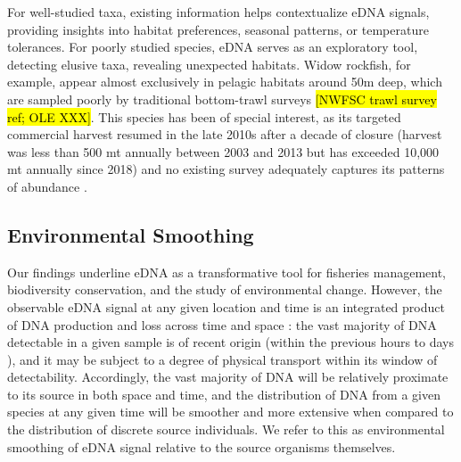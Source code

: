 \documentclass[9pt,twocolumn,twoside]{pnas-new}
\begin{document}
For well-studied taxa, existing information helps contextualize eDNA signals, providing insights into habitat preferences, seasonal patterns, or temperature tolerances. For poorly studied species, eDNA serves as an exploratory tool, detecting elusive taxa, revealing unexpected habitats. Widow rockfish, for example, appear almost exclusively in pelagic habitats around 50m deep, which are sampled poorly by traditional bottom-trawl surveys \hl{[NWFSC trawl survey ref; OLE XXX]}. This species has been of special interest, as its targeted commercial harvest resumed in the late 2010s after a decade of closure (harvest was less than 500 mt annually between 2003 and 2013 but has exceeded 10,000 mt annually since 2018) and no existing survey adequately captures its patterns of abundance \cite{adams2019a}.

\subsection*{Environmental Smoothing}
Our findings underline eDNA as a transformative tool for fisheries management, biodiversity conservation, and the study of environmental change. However, the observable eDNA signal at any given location and time is an integrated product of DNA production and loss across time and space \cite{gold2023}: the vast majority of DNA detectable in a given sample is of recent origin (within the previous hours to days \cite{strickler2015,collins2018,machler2018}), and it may be subject to a degree of physical transport within its window of detectability. Accordingly, the vast majority of DNA will be relatively proximate to its source in both space and time, and the distribution of DNA from a given species at any given time will be smoother and more extensive when compared to the distribution of discrete source individuals. We refer to this as environmental smoothing of eDNA signal relative to the source organisms themselves. 
\end{document}
